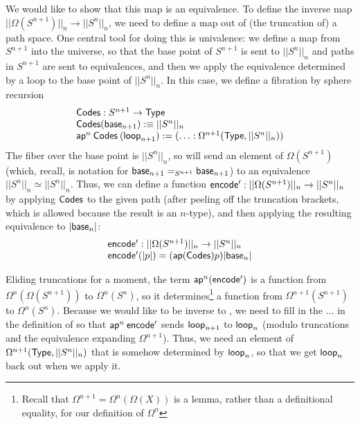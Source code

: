 We would like to show that this map is an equivalence.  To define the
inverse map $||\Omega(S^{n+1})||_n \to ||S^n||_n$, we need to define a
map out of (the truncation of) a path space.  One central tool for doing
this is univalence: we define a map from $S^{n+1}$ into the universe, so
that the base point of $S^{n+1}$ is sent to $||S^n||_n$ and paths in $S^{n+1}$
are sent to equivalences, and then we apply the
equivalence determined by a loop to the base point of $||S^n||_n$.  In
this case, we define a fibration  by sphere recursion
\[
\begin{array}{l}
\mathsf{Codes} : S^{n+1} \to \mathsf{Type} \\
\mathsf{Codes}(\mathsf{base}_{n+1}) :\equiv ||S^{n}||_n \\
\mathsf{ap}^n \: \mathsf{Codes} \: (\mathsf{loop}_{n+1}) := (\ldots : \Omega^{n+1}(\mathsf{Type},||S^{n}||_n)) \\
\end{array}
\]
The fiber over the base point is $||S^{n}||_n$, so  will send
an element of $\Omega(S^{n+1})$ (which, recall, is notation for $\mathsf{base}_{n+1}
=_{S^{n+1}} \mathsf{base}_{n+1}$) to an equivalence $||S^{n}||_n \simeq
||S^{n}||_n$.  Thus, we can define a function $\mathsf{encode'} : ||\Omega(S^{n+1})||_n \to
||S^n||_n$ by applying $\mathsf{Codes}$ to the given path (after peeling
off the truncation brackets, which is allowed because the result is an $n$-type), and then
applying the resulting equivalence to $|\mathsf{base}_n|$:
\[
\begin{array}{l}
\mathsf{encode'} : ||\Omega(S^{n+1})||_n \to ||S^n||_n \\
\mathsf{encode'}(|p|) = (\mathsf{ap}(\mathsf{Codes}) p) |\mathsf{base}_n|
\end{array}
\]

Eliding truncations for a moment, the term $\mathsf{ap}^n(\mathsf{encode'})$
is a function from $\Omega^n(\Omega(S^{n+1}))$ to $\Omega^n(S^n)$, so it
determines\footnote{Recall that $\Omega^{n+1} =
  \Omega^n(\Omega(X))$ is a lemma, rather than a definitional equality,
  for our definition of $\Omega^n$} a function from $\Omega^{n+1}(S^{n+1})$ to
$\Omega^n(S^n)$.  Because we would like 
to be inverse to , we need to fill in the $\ldots$ in the
definition of  so that $\mathsf{ap}^n \: \mathsf{encode'}$ sends
$\mathsf{loop}_{n+1}$ to $\mathsf{loop}_n$ (modulo truncations and the
equivalence expanding $\Omega^{n+1}$).  Thus, we need an element of
$\Omega^{n+1}(\mathsf{Type},||S^n||_n)$ that is somehow determined by 
$\mathsf{loop}_n$, so that we get $\mathsf{loop}_n$ back out when we apply it.  

